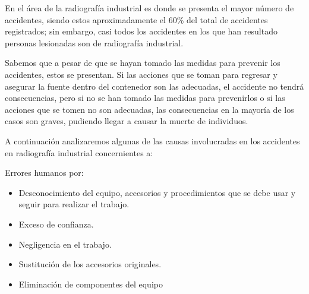 
En el área de la radiografía industrial es donde se presenta el mayor número de accidentes, siendo estos aproximadamente el 60\% del total de accidentes registrados; sin embargo, casi todos los accidentes en los que han resultado personas lesionadas son de radiografía industrial.

Sabemos que a pesar de que se hayan tomado las medidas para prevenir los accidentes, estos se presentan. Si las acciones que se toman para regresar y asegurar la fuente dentro del contenedor son las adecuadas, el accidente no tendrá consecuencias, pero si no se han tomado las medidas para prevenirlos o si las acciones que se tomen no son adecuadas, las consecuencias en la mayoría de los casos son graves, pudiendo llegar a causar la muerte de individuos.

A continuación analizaremos algunas de las causas involucradas en los accidentes en radiografía industrial concernientes a:

Errores humanos por:
\begin{itemize}
    \item Desconocimiento del equipo, accesorios y procedimientos que se debe usar y seguir para realizar el trabajo.
    \item Exceso de confianza.
    \item Negligencia en el trabajo.
    \item Sustitución de los accesorios originales.
    \item Eliminación de componentes del equipo
\end{itemize}

